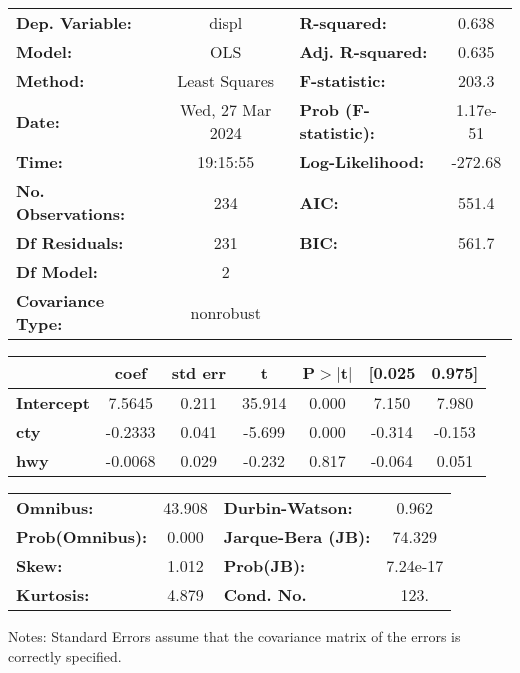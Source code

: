 \begin{center}
\begin{tabular}{lclc}
\toprule
\textbf{Dep. Variable:}    &      displ       & \textbf{  R-squared:         } &     0.638   \\
\textbf{Model:}            &       OLS        & \textbf{  Adj. R-squared:    } &     0.635   \\
\textbf{Method:}           &  Least Squares   & \textbf{  F-statistic:       } &     203.3   \\
\textbf{Date:}             & Wed, 27 Mar 2024 & \textbf{  Prob (F-statistic):} &  1.17e-51   \\
\textbf{Time:}             &     19:15:55     & \textbf{  Log-Likelihood:    } &   -272.68   \\
\textbf{No. Observations:} &         234      & \textbf{  AIC:               } &     551.4   \\
\textbf{Df Residuals:}     &         231      & \textbf{  BIC:               } &     561.7   \\
\textbf{Df Model:}         &           2      & \textbf{                     } &             \\
\textbf{Covariance Type:}  &    nonrobust     & \textbf{                     } &             \\
\bottomrule
\end{tabular}
\begin{tabular}{lcccccc}
                   & \textbf{coef} & \textbf{std err} & \textbf{t} & \textbf{P$> |$t$|$} & \textbf{[0.025} & \textbf{0.975]}  \\
\midrule
\textbf{Intercept} &       7.5645  &        0.211     &    35.914  &         0.000        &        7.150    &        7.980     \\
\textbf{cty}       &      -0.2333  &        0.041     &    -5.699  &         0.000        &       -0.314    &       -0.153     \\
\textbf{hwy}       &      -0.0068  &        0.029     &    -0.232  &         0.817        &       -0.064    &        0.051     \\
\bottomrule
\end{tabular}
\begin{tabular}{lclc}
\textbf{Omnibus:}       & 43.908 & \textbf{  Durbin-Watson:     } &    0.962  \\
\textbf{Prob(Omnibus):} &  0.000 & \textbf{  Jarque-Bera (JB):  } &   74.329  \\
\textbf{Skew:}          &  1.012 & \textbf{  Prob(JB):          } & 7.24e-17  \\
\textbf{Kurtosis:}      &  4.879 & \textbf{  Cond. No.          } &     123.  \\
\bottomrule
\end{tabular}
\end{center}

Notes: \newline
 [1] Standard Errors assume that the covariance matrix of the errors is correctly specified.